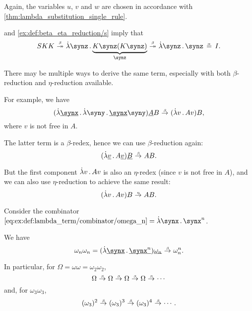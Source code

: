 \begin{example}
\begin{thmenum}
    Again, the variables \( u \), \( v \) and \( w \) are chosen in accordance with \cref{thm:lambda_substitution_single_rule}.

      and \cref{ex:def:beta_eta_reduction/s} imply that
    \begin{equation*}
      SKK \bred* \qabs \synz \underbrace{K \synz (K \synz)}_\synz \bred* \qabs \synz \synz \aequiv I.
    \end{equation*}

     There may be multiple ways to derive the same term, especially with both \( \beta \)-reduction and \( \eta \)-reduction available.

    For example, we have
    \begin{equation*}
      (\qabs {\hi{\synx}} \qabs \syny \hi{\synx} \syny) \hi{A} B \bred (\qabs v A v) B,
    \end{equation*}
    where \( v \) is not free in \( A \).

    The latter term is a \( \beta \)-redex, hence we can use \( \beta \)-reduction again:
    \begin{equation*}
      (\qabs {\hi{v}} A \hi{v}) \hi{B} \bred AB.
    \end{equation*}

    But the first component \( \qabs v A v \) is also an \( \eta \)-redex (since \( v \) is not free in \( A \)), and we can also use \( \eta \)-reduction to achieve the same result:
    \begin{equation*}
      (\qabs v A v) B \ered AB.
    \end{equation*}

     Consider the combinator \( \ref{eq:ex:def:lambda_term/combinator/omega_n} = \qabs \synx \synx^n \).

    We have
    \begin{equation*}
      \omega_n \omega_n
      =
      (\qabs {\hi{\synx}} \hi{\synx^n}) \hi{\omega_n}
      \bred
      \omega_n^n.
    \end{equation*}

    In particular, for \( \Omega = \omega \omega = \omega_2 \omega_2 \),
    \begin{equation*}
      \Omega \bred \Omega \bred \Omega \bred \Omega \bred \cdots
    \end{equation*}
    and, for \( \omega_3 \omega_3 \),
    \begin{equation*}
      (\omega_3)^2 \bred (\omega_3)^3 \bred (\omega_3)^4 \bred \cdots.
    \end{equation*}


\end{thmenum}
\end{example}
